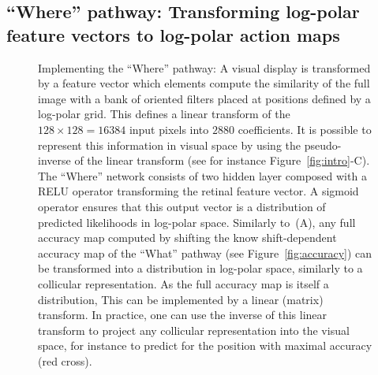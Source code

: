 \subsection{``Where'' pathway: Transforming log-polar feature vectors to log-polar action maps}
\begin{figure}[t!]%
	\caption{Implementing the ``Where'' pathway: \A A visual display is transformed by a feature vector which elements compute the similarity of the full image with a bank of oriented filters placed at positions defined by a log-polar grid. This defines a linear transform of the $128\times128=16384$ input pixels into $2880$ coefficients. It is possible to represent this information in visual space by using the pseudo-inverse of the linear transform (see for instance Figure~\ref{fig:intro}-C).
	\B The ``Where'' network consists of two hidden layer composed with a RELU operator transforming the retinal feature vector. A sigmoid operator ensures that this output vector is a distribution of predicted likelihoods in log-polar space.  %
	\C Similarly to~(A), any full accuracy map computed by shifting the know shift-dependent accuracy map of the ``What'' pathway (see Figure~\ref{fig:accuracy}) can be transformed into a distribution in log-polar space, similarly to a collicular representation. As the full accuracy map is itself a distribution, This can be implemented by a linear (matrix) transform. In practice, one can use the inverse of this linear transform to project any  collicular representation into the visual space, for instance to predict for the position with maximal accuracy (red cross).
	}
\label{fig:where}
\end{figure}
%
%
%
